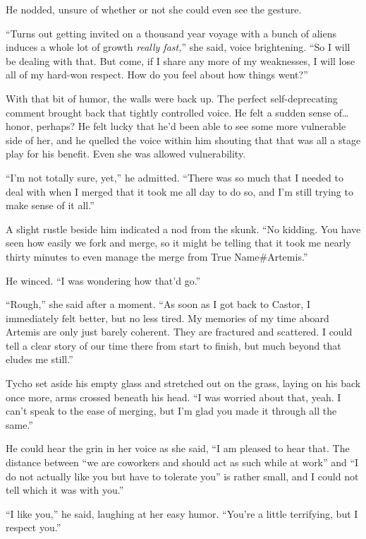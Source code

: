 He nodded, unsure of whether or not she could even see the gesture.

``Turns out getting invited on a thousand year voyage with a bunch of aliens induces a whole lot of growth \emph{really fast,}'' she said, voice brightening. ``So I will be dealing with that. But come, if I share any more of my weaknesses, I will lose all of my hard-won respect. How do you feel about how things went?''

With that bit of humor, the walls were back up. The perfect self-deprecating comment brought back that tightly controlled voice. He felt a sudden sense of\ldots honor, perhaps? He felt lucky that he'd been able to see some more vulnerable side of her, and he quelled the voice within him shouting that that was all a stage play for his benefit. Even she was allowed vulnerability.

``I'm not totally sure, yet,'' he admitted. ``There was so much that I needed to deal with when I merged that it took me all day to do so, and I'm still trying to make sense of it all.''

A slight rustle beside him indicated a nod from the skunk. ``No kidding. You have seen how easily we fork and merge, so it might be telling that it took me nearly thirty minutes to even manage the merge from True Name\#Artemis.''

He winced. ``I was wondering how that'd go.''

``Rough,'' she said after a moment. ``As soon as I got back to Castor, I immediately felt better, but no less tired. My memories of my time aboard Artemis are only just barely coherent. They are fractured and scattered. I could tell a clear story of our time there from start to finish, but much beyond that eludes me still.''

Tycho set aside his empty glass and stretched out on the grass, laying on his back once more, arms crossed beneath his head. ``I was worried about that, yeah. I can't speak to the ease of merging, but I'm glad you made it through all the same.''

He could hear the grin in her voice as she said, ``I am pleased to hear that. The distance between ``we are coworkers and should act as such while at work'' and ``I do not actually like you but have to tolerate you'' is rather small, and I could not tell which it was with you.''

``I like you,'' he said, laughing at her easy humor. ``You're a little terrifying, but I respect you.''


